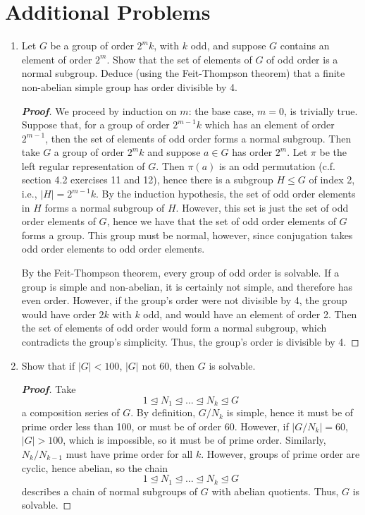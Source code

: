 \documentclass[12pt,leqno]{book}
\theoremstyle{definition}
\newenvironment{Proof}{\begin{proof}[\textnormal{\textbf{Proof}}]}{\end{proof}}
\begin{document}
\section*{Additional Problems}
\begin{enumerate}
\item Let $G$ be a group of order $2^mk$, with $k$ odd, and suppose $G$ contains an element of order $2^m$. Show that the set of elements of $G$ of odd order is a normal subgroup. Deduce (using the Feit-Thompson theorem) that a finite non-abelian simple group has order divisible by 4.

\begin{Proof}
 We proceed by induction on $m$: the base case, $m=0$, is trivially true. Suppose that, for a group of order $2^{m-1}k$ which has an element of order $2^{m-1}$, then the set of elements of odd order forms a normal subgroup. Then take $G$ a group of order $2^mk$ and suppose $a\in G$ has order $2^m$. Let $\pi$ be the left regular representation of $G$. Then $\pi(a)$ is an odd permutation (c.f. section 4.2 exercises 11 and 12), hence there is a subgroup $H\leq G$ of index 2, i.e., $|H|=2^{m-1}k$. By the induction hypothesis, the set of odd order elements in $H$ forms a normal subgroup of $H$. However, this set is just the set of odd order elements of $G$, hence we have that the set of odd order elements of $G$ forms a group. This group must be normal, however, since conjugation takes odd order elements to odd order elements.

By the Feit-Thompson theorem, every group of odd order is solvable. If a group is simple and non-abelian, it is certainly not simple, and therefore has even order. However, if the group's order were not divisible by 4, the group would have order $2k$ with $k$ odd, and would have an element of order 2. Then the set of elements of odd order would form a normal subgroup, which contradicts the group's simplicity. Thus, the group's order is divisible by 4.
\end{Proof}

\item Show that if $|G|<100$, $|G|$ not 60, then $G$ is solvable. 
\begin{Proof}
 Take \[1\unlhd N_1\unlhd\hdots\unlhd N_k\unlhd G\] a composition series of $G$. By definition, $G/N_k$ is simple, hence it must be of prime order less than 100, or must be of order 60. However, if $|G/N_k|=60$, $|G|>100$, which is impossible, so it must be of prime order. Similarly, $N_k/N_{k-1}$ must have prime order for all $k$. However, groups of prime order are cyclic, hence abelian, so the chain\[1\unlhd N_1\unlhd\hdots\unlhd N_k\unlhd G\] describes a chain of normal subgroups of $G$ with abelian quotients. Thus, $G$ is solvable. 
\end{Proof}

\end{enumerate}
\end{document}
